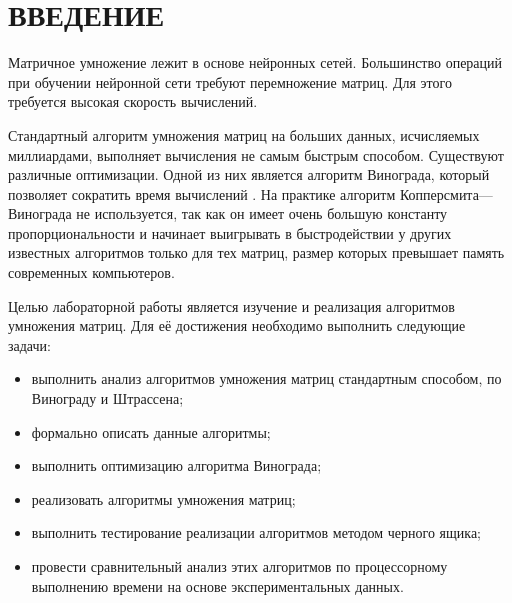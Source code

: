 \part*{ВВЕДЕНИЕ}

Матричное умножение лежит в основе нейронных сетей. Большинство операций при обучении нейронной сети требуют перемножение матриц. Для этого требуется высокая скорость вычислений.

Стандартный алгоритм умножения матриц на больших данных, исчисляемых миллиардами, выполняет вычисления не самым быстрым способом. Существуют различные оптимизации. Одной из них является алгоритм Винограда, который позволяет сократить время вычислений \cite{winograd-origin}. На практике алгоритм Копперсмита—Винограда не используется, так как он имеет очень большую константу пропорциональности и начинает выигрывать в быстродействии у других известных алгоритмов только для тех матриц, размер которых превышает память современных компьютеров.

Целью лабораторной работы является изучение и реализация алгоритмов умножения матриц. Для её достижения необходимо выполнить следующие задачи:
\begin{itemize}
	\item выполнить анализ алгоритмов умножения матриц стандартным способом, по Винограду и Штрассена;
	\item формально описать данные алгоритмы;
	\item выполнить оптимизацию алгоритма Винограда;
	\item реализовать алгоритмы умножения матриц;
	\item выполнить тестирование реализации алгоритмов методом черного ящика;
	\item провести сравнительный анализ этих алгоритмов по процессорному выполнению времени на основе экспериментальных данных.
\end{itemize}
